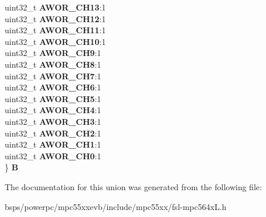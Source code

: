 \begin{DoxyCompactItemize}
\begin{tabbing}
\>uint32\_t {\bfseries AWOR\_CH13}:1\\
\>uint32\_t {\bfseries AWOR\_CH12}:1\\
\>uint32\_t {\bfseries AWOR\_CH11}:1\\
\>uint32\_t {\bfseries AWOR\_CH10}:1\\
\>uint32\_t {\bfseries AWOR\_CH9}:1\\
\>uint32\_t {\bfseries AWOR\_CH8}:1\\
\>uint32\_t {\bfseries AWOR\_CH7}:1\\
\>uint32\_t {\bfseries AWOR\_CH6}:1\\
\>uint32\_t {\bfseries AWOR\_CH5}:1\\
\>uint32\_t {\bfseries AWOR\_CH4}:1\\
\>uint32\_t {\bfseries AWOR\_CH3}:1\\
\>uint32\_t {\bfseries AWOR\_CH2}:1\\
\>uint32\_t {\bfseries AWOR\_CH1}:1\\
\>uint32\_t {\bfseries AWOR\_CH0}:1\\
\} {\bfseries B}\\

\end{tabbing}\end{DoxyCompactItemize}


The documentation for this union was generated from the following file\+:\begin{DoxyCompactItemize}
\item 
bsps/powerpc/mpc55xxevb/include/mpc55xx/fsl-\/mpc564x\+L.\+h\end{DoxyCompactItemize}
